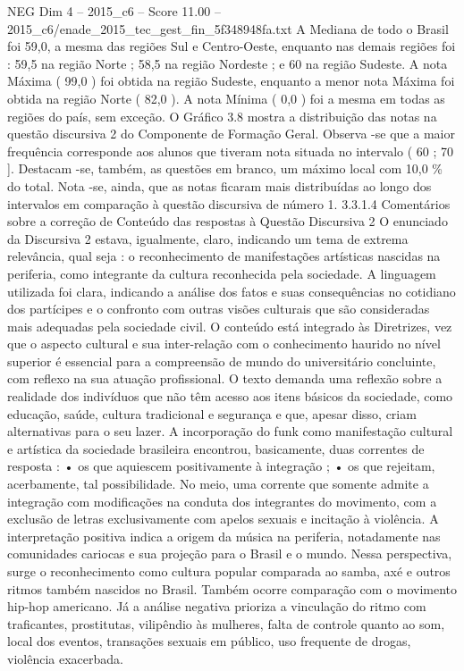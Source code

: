 \begin{textsample}{NEG Dim 4 – 2015\_c6 – Score 11.00 – 2015\_c6/enade\_2015\_tec\_gest\_fin\_5f348948fa.txt}
A Mediana de todo o Brasil foi 59,0, a mesma das regiões Sul e Centro-Oeste, enquanto nas demais regiões foi : 59,5 na região Norte ; 58,5 na região Nordeste ; e 60 na região Sudeste.
A nota Máxima ( 99,0 ) foi obtida na região Sudeste, enquanto a menor nota Máxima foi obtida na região Norte ( 82,0 ).
A nota Mínima ( 0,0 ) foi a mesma em todas as regiões do país, sem exceção.
O Gráfico 3.8 mostra a distribuição das notas na questão discursiva 2 do Componente de Formação Geral.
Observa -se que a maior frequência corresponde aos alunos que tiveram nota situada no intervalo ( 60 ; 70 ].
Destacam -se, também, as questões em branco, um máximo local com 10,0 \% do total.
Nota -se, ainda, que as notas ficaram mais distribuídas ao longo dos intervalos em comparação à questão discursiva de número 1. 3.3.1.4 Comentários sobre a correção de Conteúdo das respostas à Questão Discursiva 2 O enunciado da Discursiva 2 estava, igualmente, claro, indicando um tema de extrema relevância, qual seja : o reconhecimento de manifestações artísticas nascidas na periferia, como integrante da cultura reconhecida pela sociedade.
A linguagem utilizada foi clara, indicando a análise dos fatos e suas consequências no cotidiano dos partícipes e o confronto com outras visões culturais que são consideradas mais adequadas pela sociedade civil.
O conteúdo está integrado às Diretrizes, vez que o aspecto cultural e sua inter-relação com o conhecimento haurido no nível superior é essencial para a compreensão de mundo do universitário concluinte, com reflexo na sua atuação profissional.
O texto demanda uma reflexão sobre a realidade dos indivíduos que não têm acesso aos itens básicos da sociedade, como educação, saúde, cultura tradicional e segurança e que, apesar disso, criam alternativas para o seu lazer.
A incorporação do funk como manifestação cultural e artística da sociedade brasileira encontrou, basicamente, duas correntes de resposta : • os que aquiescem positivamente à integração ; • os que rejeitam, acerbamente, tal possibilidade.
No meio, uma corrente que somente admite a integração com modificações na conduta dos integrantes do movimento, com a exclusão de letras exclusivamente com apelos sexuais e incitação à violência.
A interpretação positiva indica a origem da música na periferia, notadamente nas comunidades cariocas e sua projeção para o Brasil e o mundo.
Nessa perspectiva, surge o reconhecimento como cultura popular comparada ao samba, axé e outros ritmos também nascidos no Brasil.
Também ocorre comparação com o movimento hip-hop americano.
Já a análise negativa prioriza a vinculação do ritmo com traficantes, prostitutas, vilipêndio às mulheres, falta de controle quanto ao som, local dos eventos, transações sexuais em público, uso frequente de drogas, violência exacerbada.

\end{textsample}
